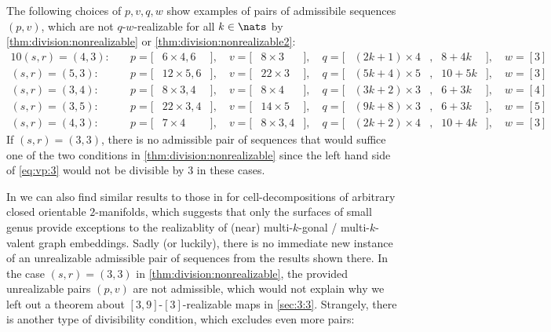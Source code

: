 \begin{example}
  The following choices of $p, v, q, w$ show examples of pairs of admissibile sequences~$(p, v)$, which are not $q$-$w$-realizable for all $k \in \nats$ by \autoref{thm:division:nonrealizable} or \autoref{thm:division:nonrealizable2}:
  \begin{alignat*}{10}
    (s, r) = (4, 3):\quad& p = [& 6 \times 4, 6&], \quad v = [& 8 \times 3   &], \quad q = [&(2k + 1) \times 4&,{} & 8 + 4k&], \quad w = [3]\\
    (s, r) = (5, 3):\quad& p = [&12 \times 5, 6&], \quad v = [&22 \times 3   &], \quad q = [&(5k + 4) \times 5&,{} &10 + 5k&], \quad w = [3]\\
    (s, r) = (3, 4):\quad& p = [& 8 \times 3, 4&], \quad v = [& 8 \times 4   &], \quad q = [&(3k + 2) \times 3&,{} & 6 + 3k&], \quad w = [4]\\
    (s, r) = (3, 5):\quad& p = [&22 \times 3, 4&], \quad v = [&14 \times 5   &], \quad q = [&(9k + 8) \times 3&,{} & 6 + 3k&], \quad w = [5]\\
    (s, r) = (4, 3):\quad& p = [& 7 \times 4   &], \quad v = [& 8 \times 3, 4&], \quad q = [&(2k + 2) \times 4&,{} &10 + 4k&], \quad w = [3]
  \end{alignat*}
  If $(s, r) = (3, 3)$, there is no admissible pair of sequences that would suffice one of the two conditions in \autoref{thm:division:nonrealizable} since the left hand side of \autoref{eq:vp:3} would not be divisible by $3$ in these cases.
\end{example}

In \cite{horvnak1977nearly} we can also find similar results to those in \cite{malkevitch1970properties} for cell-decompositions of arbitrary closed orientable $2$-manifolds, which suggests that only the surfaces of small genus provide exceptions to the realizablity of (near) multi-$k$-gonal / multi-$k$-valent graph embeddings. Sadly (or luckily), there is no immediate new instance of an unrealizable admissible pair of sequences from the results shown there. In the case $(s, r) = (3, 3)$ in \autoref{thm:division:nonrealizable}, the provided unrealizable pairs $(p, v)$ are not admissible, which would not explain why we left out a theorem about $[3, 9]$-$[3]$-realizable maps in \autoref{sec:3:3}. Strangely, there is another type of divisibility condition, which excludes even more pairs:

